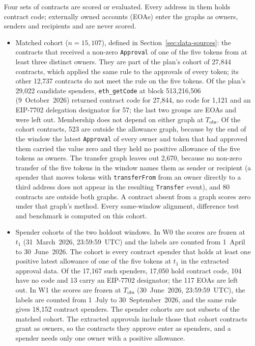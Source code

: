 
Four sets of contracts are scored or evaluated. Every address in them holds contract code; externally owned accounts (EOAs) enter the graphs as owners, senders and recipients and are never scored.

\begin{itemize}
\item Matched cohort ($n=15{,}107$), defined in Section~\ref{sec:data-sources}: the contracts that received a non-zero \texttt{Approval} of one of the five tokens from at least three distinct owners. They are part of the plan's cohort of 27,844 contracts, which applied the same rule to the approvals of every token; its other 12,737 contracts do not meet the rule on the five tokens. Of the plan's 29,022 candidate spenders, \texttt{eth\_getCode} at block 513,216,506 (9~October~2026) returned contract code for 27,844, no code for 1,121 and an EIP-7702 delegation designator \parencite{buterin2024eip7702} for 57; the last two groups are EOAs and were left out. Membership does not depend on either graph at $T_{\mathrm{obs}}$. Of the cohort contracts, 523 are outside the allowance graph, because by the end of the window the latest \texttt{Approval} of every owner and token that had approved them carried the value zero and they held no positive allowance of the five tokens as owners. The transfer graph leaves out 2,670, because no non-zero transfer of the five tokens in the window names them as sender or recipient (a spender that moves tokens with \texttt{transferFrom} from an owner directly to a third address does not appear in the resulting \texttt{Transfer} event), and 80 contracts are outside both graphs. A contract absent from a graph scores zero under that graph's method. Every same-window alignment, difference test and benchmark is computed on this cohort.
\item Spender cohorts of the two holdout windows. In W0 the scores are frozen at $t_1$ (31~March~2026, 23:59:59~UTC) and the labels are counted from 1~April to 30~June~2026. The cohort is every contract spender that holds at least one positive latest allowance of one of the five tokens at $t_1$ in the extracted approval data. Of the 17,167 such spenders, 17,050 hold contract code, 104 have no code and 13 carry an EIP-7702 designator; the 117 EOAs are left out. In W1 the scores are frozen at $T_{\mathrm{obs}}$ (30~June~2026, 23:59:59~UTC), the labels are counted from 1~July to 30~September~2026, and the same rule gives 18,152 contract spenders. The spender cohorts are not subsets of the matched cohort. The extracted approvals include those that cohort contracts grant as owners, so the contracts they approve enter as spenders, and a spender needs only one owner with a positive allowance.

\end{itemize}
